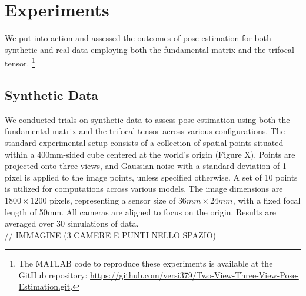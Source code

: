 \section{Experiments}\label{sec:experiments}
We put into action and assessed the outcomes of pose estimation for both synthetic and real data employing both the fundamental matrix and the trifocal tensor. \footnote{The MATLAB code to reproduce these experiments is available at the GitHub repository: \href{https://github.com/versi379/Two-View-Three-View-Pose-Estimation.git}{https://github.com/versi379/Two-View-Three-View-Pose-Estimation.git}.}

\subsection{Synthetic Data}
We conducted trials on synthetic data to assess pose estimation using both the fundamental matrix and the trifocal tensor across various configurations. The standard experimental setup consists of a collection of spatial points situated within a 400mm-sided cube centered at the world's origin (Figure X). Points are projected onto three views, and Gaussian noise with a standard deviation of 1 pixel is applied to the image points, unless specified otherwise. A set of 10 points is utilized for computations across various models. The image dimensions are \( 1800 \times 1200 \) pixels, representing a sensor size of \( 36mm \times 24mm \), with a fixed focal length of 50mm. All cameras are aligned to focus on the origin. Results are averaged over 30 simulations of data.\\

// IMMAGINE (3 CAMERE E PUNTI NELLO SPAZIO)

